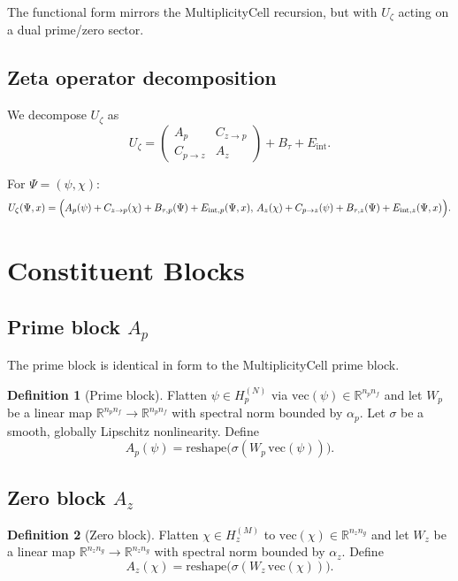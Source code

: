\documentclass[11pt]{article}
\theoremstyle{definition}
\newtheorem{definition}{Definition}
\theoremstyle{plain}
\begin{document}
The functional form mirrors the MultiplicityCell recursion, but with $U_\zeta$ acting on a dual prime/zero sector.

\subsection{Zeta operator decomposition}

We decompose $U_\zeta$ as
\[
  U_\zeta =
  \begin{pmatrix}
    A_p & C_{z\to p} \\
    C_{p\to z} & A_z
  \end{pmatrix}
  + B_\tau + E_{\mathrm{int}}.
\]

For $\Psi = (\psi,\chi)$:
\[
  U_\zeta(\Psi,x) =
  \Bigl(
    A_p(\psi) + C_{z\to p}(\chi) + B_{\tau,p}(\Psi) + E_{\mathrm{int},p}(\Psi,x),
    \,
    A_z(\chi) + C_{p\to z}(\psi) + B_{\tau,z}(\Psi) + E_{\mathrm{int},z}(\Psi,x)
  \Bigr).
\]

\section{Constituent Blocks}

\subsection{Prime block $A_p$}

The prime block is identical in form to the MultiplicityCell prime block.

\begin{definition}[Prime block]
Flatten $\psi\in H_p^{(N)}$ via $\mathrm{vec}(\psi) \in \mathbb{R}^{n_p n_f}$ and let $W_p$ be a linear map $\mathbb{R}^{n_p n_f}\to\mathbb{R}^{n_p n_f}$ with spectral norm bounded by $\alpha_p$.
Let $\sigma$ be a smooth, globally Lipschitz nonlinearity.
Define
\[
  A_p(\psi) = \mathrm{reshape}\bigl(\sigma(W_p\,\mathrm{vec}(\psi))\bigr).
\]
\end{definition}

\subsection{Zero block $A_z$}

\begin{definition}[Zero block]
Flatten $\chi\in H_z^{(M)}$ to $\mathrm{vec}(\chi)\in\mathbb{R}^{n_z n_g}$ and let $W_z$ be a linear map $\mathbb{R}^{n_z n_g}\to\mathbb{R}^{n_z n_g}$ with spectral norm bounded by $\alpha_z$.
Define
\[
  A_z(\chi) = \mathrm{reshape}\bigl(\sigma(W_z\,\mathrm{vec}(\chi))\bigr).
\]
\end{definition}
\end{document}
